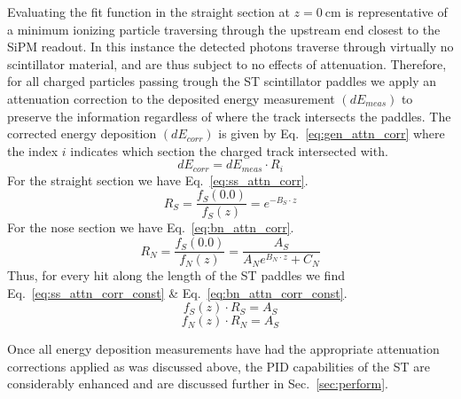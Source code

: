 Evaluating the fit function in the straight section at $z = 0\ \mathrm{cm}$ is representative of a minimum ionizing particle traversing through the upstream end closest to the SiPM readout.  In this instance the detected photons traverse through virtually no scintillator material, and are thus subject to no effects of attenuation.  Therefore, for all charged particles passing trough the ST scintillator paddles we apply an attenuation correction to the deposited energy measurement $(dE_{meas})$ to preserve the information regardless of where the track intersects the paddles.  The corrected energy deposition $(dE_{corr})$ is given by Eq.~\ref{eq:gen_attn_corr} where the index $i$ indicates which section the charged track intersected with.
	\begin{equation} \label{eq:gen_attn_corr}
		dE_{corr} = dE_{meas} \cdot R_{i}
	\end{equation}
For the straight section we have Eq.~\ref{eq:ss_attn_corr}.
	\begin{equation} \label{eq:ss_attn_corr}
		R_{S} = \frac{f_{S}(0.0)}{f_{S}(z)} = e^{-B_{S} \cdot z}
	\end{equation}
For the nose section we have Eq.~\ref{eq:bn_attn_corr}.
	\begin{equation} \label{eq:bn_attn_corr}
		R_{N} = \frac{f_{S}(0.0)}{f_{N}(z)} = \frac{A_{S}}{A_{N}e^{B_{N} \cdot z} + C_{N}}
	\end{equation}
Thus, for every hit along the length of the ST paddles we find Eq.~\ref{eq:ss_attn_corr_const} \& Eq.~\ref{eq:bn_attn_corr_const}.
	\begin{equation} \label{eq:ss_attn_corr_const}
		f_{S}(z) \cdot R_{S} = A_{S}
	\end{equation}
	\begin{equation} \label{eq:bn_attn_corr_const}
		f_{N}(z) \cdot R_{N} = A_{S}
	\end{equation}

Once all energy deposition measurements have had the appropriate attenuation corrections applied as was discussed above, the PID capabilities of the ST are considerably enhanced and are discussed further in Sec.~\ref{sec:perform}.

